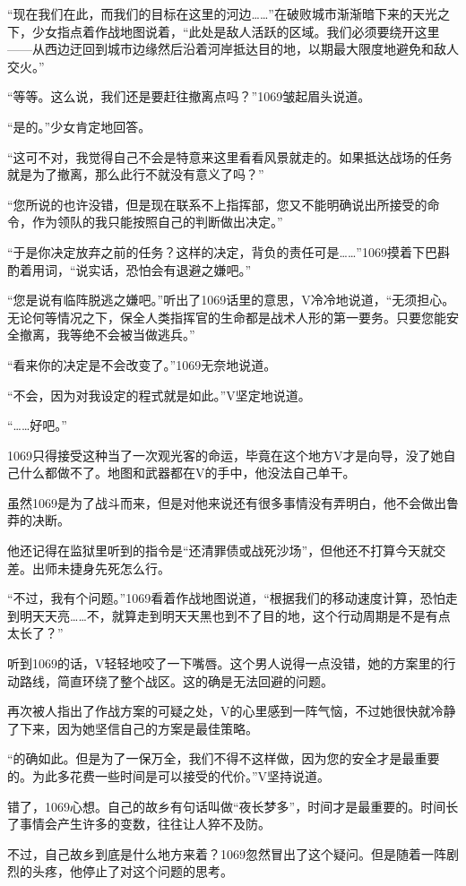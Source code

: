 “现在我们在此，而我们的目标在这里的河边……”在破败城市渐渐暗下来的天光之下，少女指点着作战地图说着，“此处是敌人活跃的区域。我们必须要绕开这里——从西边迂回到城市边缘然后沿着河岸抵达目的地，以期最大限度地避免和敌人交火。”

“等等。这么说，我们还是要赶往撤离点吗？”1069皱起眉头说道。

“是的。”少女肯定地回答。

“这可不对，我觉得自己不会是特意来这里看看风景就走的。如果抵达战场的任务就是为了撤离，那么此行不就没有意义了吗？”

“您所说的也许没错，但是现在联系不上指挥部，您又不能明确说出所接受的命令，作为领队的我只能按照自己的判断做出决定。”

“于是你决定放弃之前的任务？这样的决定，背负的责任可是……”1069摸着下巴斟酌着用词，“说实话，恐怕会有退避之嫌吧。”

“您是说有临阵脱逃之嫌吧。”听出了1069话里的意思，V冷冷地说道，“无须担心。无论何等情况之下，保全人类指挥官的生命都是战术人形的第一要务。只要您能安全撤离，我等绝不会被当做逃兵。”

“看来你的决定是不会改变了。”1069无奈地说道。

“不会，因为对我设定的程式就是如此。”V坚定地说道。

“……好吧。”

1069只得接受这种当了一次观光客的命运，毕竟在这个地方V才是向导，没了她自己什么都做不了。地图和武器都在V的手中，他没法自己单干。

虽然1069是为了战斗而来，但是对他来说还有很多事情没有弄明白，他不会做出鲁莽的决断。

他还记得在监狱里听到的指令是“还清罪债或战死沙场”，但他还不打算今天就交差。出师未捷身先死怎么行。

“不过，我有个问题。”1069看着作战地图说道，“根据我们的移动速度计算，恐怕走到明天天亮……不，就算走到明天天黑也到不了目的地，这个行动周期是不是有点太长了？”

听到1069的话，V轻轻地咬了一下嘴唇。这个男人说得一点没错，她的方案里的行动路线，简直环绕了整个战区。这的确是无法回避的问题。

再次被人指出了作战方案的可疑之处，V的心里感到一阵气恼，不过她很快就冷静了下来，因为她坚信自己的方案是最佳策略。

“的确如此。但是为了一保万全，我们不得不这样做，因为您的安全才是最重要的。为此多花费一些时间是可以接受的代价。”V坚持说道。

错了，1069心想。自己的故乡有句话叫做“夜长梦多”，时间才是最重要的。时间长了事情会产生许多的变数，往往让人猝不及防。

不过，自己故乡到底是什么地方来着？1069忽然冒出了这个疑问。但是随着一阵剧烈的头疼，他停止了对这个问题的思考。

